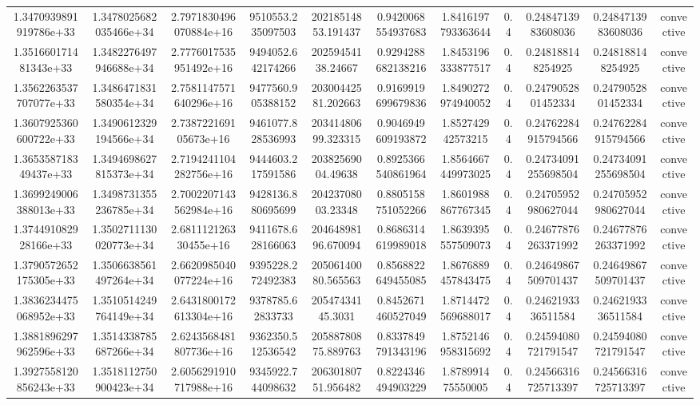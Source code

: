 \begin{table}
\begin{tabular}{ccccccccccc}
1.3470939891919786e+33 & 1.3478025682035466e+34 & 2.7971830496070884e+16 & 9510553.235097503 & 20218514853.191437 & 0.9420068554937683 & 1.8416197793363644 & 0.4 & 0.2484713983608036 & 0.2484713983608036 & convective \\
1.351660171481343e+33 & 1.3482276497946688e+34 & 2.7776017535951492e+16 & 9494052.642174266 & 20259454138.24667 & 0.9294288682138216 & 1.8453196333877517 & 0.4 & 0.248188148254925 & 0.248188148254925 & convective \\
1.3562263537707077e+33 & 1.3486471831580354e+34 & 2.7581147571640296e+16 & 9477560.905388152 & 20300442581.202663 & 0.9169919699679836 & 1.8490272974940052 & 0.4 & 0.2479052801452334 & 0.2479052801452334 & convective \\
1.3607925360600722e+33 & 1.3490612329194566e+34 & 2.738722169105673e+16 & 9461077.828536993 & 20341480699.323315 & 0.9046949609193872 & 1.852742942573215 & 0.4 & 0.24762284915794566 & 0.24762284915794566 & convective \\
1.365358718349437e+33 & 1.3494698627815373e+34 & 2.7194241104282756e+16 & 9444603.217591586 & 20382569004.49638 & 0.8925366540861964 & 1.8564667449973025 & 0.4 & 0.24734091255698504 & 0.24734091255698504 & convective \\
1.3699249006388013e+33 & 1.3498731355236785e+34 & 2.7002207143562984e+16 & 9428136.880695699 & 20423708003.23348 & 0.8805158751052266 & 1.8601988867767345 & 0.4 & 0.24705952980627044 & 0.24705952980627044 & convective \\
1.374491082928166e+33 & 1.3502711130020773e+34 & 2.681112126330455e+16 & 9411678.628166063 & 20464898196.670094 & 0.8686314619989018 & 1.8639395557509073 & 0.4 & 0.24677876263371992 & 0.24677876263371992 & convective \\
1.3790572652175305e+33 & 1.3506638561497264e+34 & 2.6620985040077224e+16 & 9395228.272492383 & 20506140080.565563 & 0.8568822649455085 & 1.8676889457843475 & 0.4 & 0.24649867509701437 & 0.24649867509701437 & convective \\
1.3836234475068952e+33 & 1.3510514249764149e+34 & 2.6431800172613304e+16 & 9378785.62833733 & 20547434145.3031 & 0.8452671460527049 & 1.8714472569688017 & 0.4 & 0.2462193336511584 & 0.2462193336511584 & convective \\
1.3881896297962596e+33 & 1.3514338785687266e+34 & 2.6243568481807736e+16 & 9362350.512536542 & 20588780875.889763 & 0.8337849791343196 & 1.8752146958315692 & 0.4 & 0.24594080721791547 & 0.24594080721791547 & convective \\
1.3927558120856243e+33 & 1.3518112750900423e+34 & 2.6056291910717988e+16 & 9345922.744098632 & 20630180751.956482 & 0.8224346494903229 & 1.878991475550005 & 0.4 & 0.24566316725713397 & 0.24566316725713397 & convective \\

\end{tabular}
\end{table}
